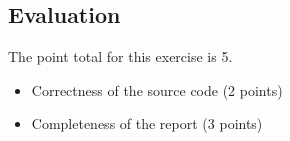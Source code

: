 \subsection{Evaluation}

The point total for this exercise is 5.

\begin{itemize}
\item Correctness of the source code (2 points)
\item	Completeness of the report (3 points)
\end{itemize}

